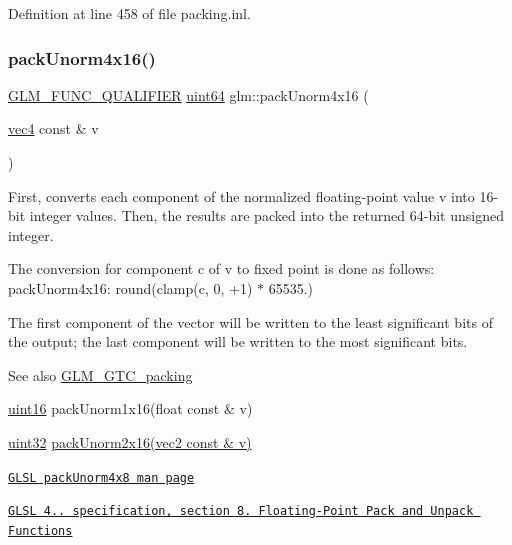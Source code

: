 Definition at line 458 of file packing.\+inl.

\mbox{\label{group__gtc__packing_gac561f06c908b7302537a8ef29fcb409e}} 
\subsubsection{\texorpdfstring{pack\+Unorm4x16()}{packUnorm4x16()}}
{\footnotesize\ttfamily \hyperlink{setup_8hpp_a33fdea6f91c5f834105f7415e2a64407}{G\+L\+M\+\_\+\+F\+U\+N\+C\+\_\+\+Q\+U\+A\+L\+I\+F\+I\+ER} \hyperlink{group__gtc__type__precision_gae3632bf9b37da66233d78930dd06378a}{uint64} glm\+::pack\+Unorm4x16 (\begin{DoxyParamCaption}\item[{\hyperlink{group__core__types_ga5881b1b022d7fd1b7218f5916532dd02}{vec4} const \&}]{v }\end{DoxyParamCaption})}

First, converts each component of the normalized floating-\/point value v into 16-\/bit integer values. Then, the results are packed into the returned 64-\/bit unsigned integer.

The conversion for component c of v to fixed point is done as follows\+: pack\+Unorm4x16\+: round(clamp(c, 0, +1) $\ast$ 65535.)

The first component of the vector will be written to the least significant bits of the output; the last component will be written to the most significant bits.

\begin{DoxySeeAlso}{See also}
\hyperlink{group__gtc__packing}{G\+L\+M\+\_\+\+G\+T\+C\+\_\+packing} 

\hyperlink{group__gtc__type__precision_gad8c2939e1fdd8e5828b31d95c52255d5}{uint16} pack\+Unorm1x16(float const \& v) 

\hyperlink{group__gtc__type__precision_ga202b6a53c105fcb7e531f9b443518451}{uint32} \hyperlink{group__core__func__packing_ga0659ddaf09727551c7bf51655d2a65cf}{pack\+Unorm2x16(vec2 const \& v)} 

\href{http://www.opengl.org/sdk/docs/manglsl/xhtml/packUnorm4x8.xml}{\tt G\+L\+SL pack\+Unorm4x8 man page} 

\href{http://www.opengl.org/registry/doc/GLSLangSpec.4.20.8.pdf}{\tt G\+L\+SL 4.. specification, section 8. Floating-\/\+Point Pack and Unpack Functions} 
\end{DoxySeeAlso}


